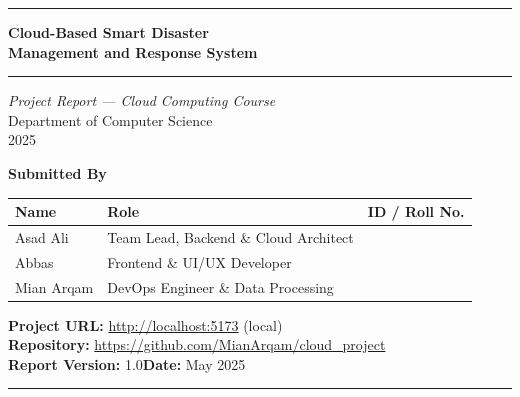 \documentclass[12pt, a4paper]{report}
\begin{document}
\begin{titlepage}
  \centering
  \vspace*{1.5cm}

  {\color{primary}\rule{\textwidth}{2pt}}
  \vspace{0.4cm}

  {\huge\bfseries Cloud-Based Smart Disaster\\[6pt]
   Management and Response System}

  \vspace{0.3cm}
  {\color{primary}\rule{\textwidth}{0.8pt}}
  \vspace{1cm}

  {\large\textit{Project Report --- Cloud Computing Course}}\\[0.3cm]
  {\large Department of Computer Science}\\[0.1cm]
  {\large 2025}

  \vspace{2cm}

  \begin{tcolorbox}[
    enhanced, colback=primary!5, colframe=primary, arc=6pt,
    width=0.85\textwidth, halign=center,
  ]
    \large\textbf{Submitted By}\\[0.8cm]
    \begin{tabular}{lll}
      \toprule
      \textbf{Name} & \textbf{Role} & \textbf{ID / Roll No.} \\
      \midrule
      Asad Ali   & Team Lead, Backend \& Cloud Architect & \hspace{2cm} \\[4pt]
      Abbas      & Frontend \& UI/UX Developer           & \hspace{2cm} \\[4pt]
      Mian Arqam & DevOps Engineer \& Data Processing    & \hspace{2cm} \\
      \bottomrule
    \end{tabular}
  \end{tcolorbox}

  \vspace{2cm}

  \begin{tcolorbox}[
    enhanced, colback=surface!5, colframe=surface!40, arc=6pt,
    width=0.7\textwidth, halign=center,
  ]
    {\small\color{codecmt}
      \textbf{Project URL:} \url{http://localhost:5173} (local)\\[4pt]
      \textbf{Repository:} \url{https://github.com/MianArqam/cloud_project}\\[4pt]
      \textbf{Report Version:} 1.0\quad\textbf{Date:} May 2025
    }
  \end{tcolorbox}

  \vfill
  {\color{primary}\rule{\textwidth}{2pt}}
\end{titlepage}
\end{document}
